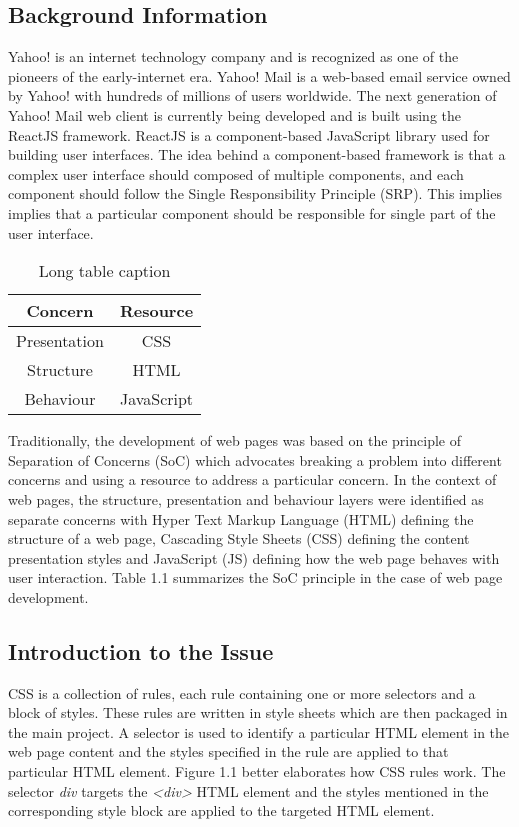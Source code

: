 \documentclass[12pt]{article}
\begin{document}
\subsection{Background Information}

Yahoo! is an internet technology company and is recognized as one of the pioneers of the early-internet era. Yahoo! Mail is a web-based email service owned by Yahoo! with hundreds of millions of users worldwide. The next generation of Yahoo! Mail web client is currently being developed and is built using the ReactJS framework. ReactJS is a component-based JavaScript library used for building user interfaces. The idea behind a component-based framework is that a complex user interface should composed of multiple components, and each component should follow the Single Responsibility Principle (SRP). This implies implies that a particular component should be responsible for single part of the user interface.

\vspace{0.5cm}

\begin{table}[h]
	\centering
	\begin{tabular}{|c|c|}
		\hline
		\textbf{Concern} & \textbf{Resource} \\ 
		\hline
		Presentation & CSS \\
		\hline 
		Structure & HTML \\
		\hline
		Behaviour & JavaScript \\
		\hline
	\end{tabular}
	\caption{Long table caption}
\end{table}

\vspace{0.5cm}

Traditionally, the development of web pages was based on the principle of Separation of Concerns (SoC) which advocates breaking a problem into different concerns and using a resource to address a particular concern. In the context of web pages, the structure, presentation and behaviour layers were identified as separate concerns with Hyper Text Markup Language (HTML) defining the structure of a web page, Cascading Style Sheets (CSS) defining the content presentation styles and JavaScript (JS) defining how the web page behaves with user interaction. Table 1.1 summarizes the SoC principle in the case of web page development.

\subsection{Introduction to the Issue}
CSS is a collection of rules, each rule containing one or more selectors and a block of styles. These rules are written in style sheets which are then packaged in the main project. A selector is used to identify a particular HTML element in the web page content and the styles specified in the rule are applied to that particular HTML element. Figure 1.1 better elaborates how CSS rules work. The selector \textit{div} targets the \textit{<div>} HTML element and the styles mentioned in the corresponding style block are applied to the targeted HTML element.
\end{document}
